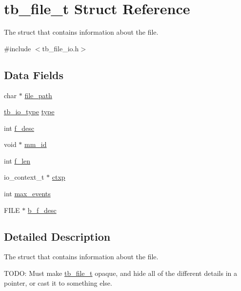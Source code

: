 \hypertarget{structtb__file__t}{\section{tb\-\_\-file\-\_\-t Struct Reference}
\label{structtb__file__t}
}


The struct that contains information about the file.  




{\ttfamily \#include $<$tb\-\_\-file\-\_\-io.\-h$>$}

\subsection*{Data Fields}
\begin{DoxyCompactItemize}
\item 
char $\ast$ \hyperlink{structtb__file__t_a19064fd51f3a2b4b3c6e8ac8c09850c2}{file\-\_\-path}
\item 
\hyperlink{tb__file__io_8h_a365107762359ca7508e1b789f8f12c2b}{tb\-\_\-io\-\_\-type} \hyperlink{structtb__file__t_a07ad170ac1adff83d1576b84ae995524}{type}
\item 
int \hyperlink{structtb__file__t_af6bfabeceb7d9e92a4a6d0f6ebdf3eec}{f\-\_\-desc}
\item 
void $\ast$ \hyperlink{structtb__file__t_a5be3643cb0aa04b06dd3f51a963a2b0f}{mm\-\_\-id}
\item 
int \hyperlink{structtb__file__t_a38103e9c674089353d1d072b3090d769}{f\-\_\-len}
\item 
io\-\_\-context\-\_\-t $\ast$ \hyperlink{structtb__file__t_ac4adc03fcdbc31dfd91163290186838c}{ctxp}
\item 
int \hyperlink{structtb__file__t_af33c7ec0520688c34f813b2ef1e2a8a8}{max\-\_\-events}
\item 
F\-I\-L\-E $\ast$ \hyperlink{structtb__file__t_a311cbc9163c962f6ed656f1a9b45c808}{b\-\_\-f\-\_\-desc}
\end{DoxyCompactItemize}


\subsection{Detailed Description}
The struct that contains information about the file. 

T\-O\-D\-O\-: Must make \hyperlink{structtb__file__t}{tb\-\_\-file\-\_\-t} opaque, and hide all of the different details in a pointer, or cast it to something else. 

